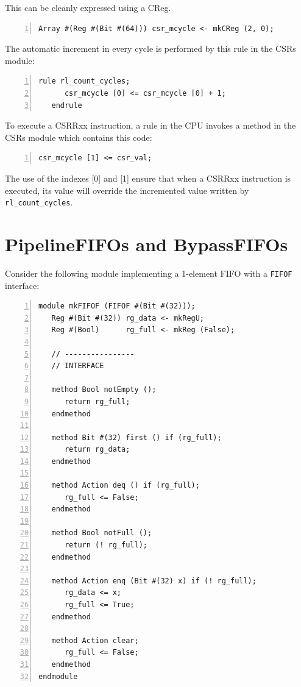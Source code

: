 This can be cleanly expressed using a CReg.

{\footnotesize
\begin{Verbatim}[frame=single, numbers=left, label=from src\_Common/CSRs.bsv]
   Array #(Reg #(Bit #(64))) csr_mcycle <- mkCReg (2, 0);
\end{Verbatim}
}

The automatic increment in every cycle is performed by this rule in
the CSRs module:
{\footnotesize
\begin{Verbatim}[frame=single, numbers=left, label=from src\_Common/CSRs.bsv]
   rule rl_count_cycles;
      csr_mcycle [0] <= csr_mcycle [0] + 1;
   endrule
\end{Verbatim}
}

To execute a CSRRxx instruction, a rule in the CPU invokes a method in
the CSRs module which contains this code:

{\footnotesize
\begin{Verbatim}[frame=single, numbers=left, label=from src\_Common/CSRs.bsv]
   csr_mcycle [1] <= csr_val;
\end{Verbatim}
}

The use of the indexes [0] and [1] ensure that when a CSRRxx
instruction is executed, its value will override the incremented value
written by \verb|rl_count_cycles|.


\section{PipelineFIFOs and BypassFIFOs}

\label{Sec_SpecialFIFOs}

Consider the following module implementing a 1-element FIFO with a
\verb|FIFOF| interface:

{\footnotesize
\begin{Verbatim}[frame=single, numbers=left]
module mkFIFOF (FIFOF #(Bit #(32)));
   Reg #(Bit #(32)) rg_data <- mkRegU;
   Reg #(Bool)      rg_full <- mkReg (False);

   // ----------------
   // INTERFACE

   method Bool notEmpty ();
      return rg_full;
   endmethod

   method Bit #(32) first () if (rg_full);
      return rg_data;
   endmethod

   method Action deq () if (rg_full);
      rg_full <= False;
   endmethod

   method Bool notFull ();
      return (! rg_full);
   endmethod

   method Action enq (Bit #(32) x) if (! rg_full);
      rg_data <= x;
      rg_full <= True;
   endmethod

   method Action clear;
      rg_full <= False;
   endmethod
endmodule
\end{Verbatim}
}


